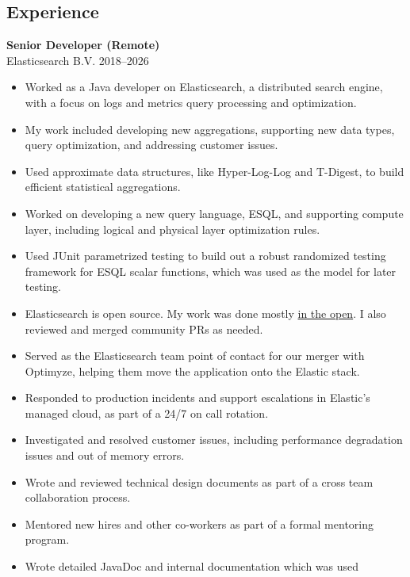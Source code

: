 \documentclass[margin]{res}
\begin{document}
\begin{resume}
\section{Experience}
{\bf Senior Developer (Remote)} \\
    Elasticsearch B.V. \hfill 2018--2026
    \begin{itemize}
        \item Worked as a Java developer on Elasticsearch, a distributed search
            engine, with a focus on logs and metrics query processing and optimization. 
        \item My work included developing new aggregations, supporting new data types,
            query optimization, and addressing customer issues.
        \item Used approximate data structures, like Hyper-Log-Log and T-Digest,
            to build efficient statistical aggregations.
        \item Worked on developing a new query language, ESQL, and supporting
            compute layer, including logical and physical layer optimization rules.
        \item Used JUnit parametrized testing to build out a robust randomized
            testing framework for ESQL scalar functions, which was used as the
            model for later testing.
        \item Elasticsearch is open source.  My work was done mostly
            \href{https://github.com/elastic/elasticsearch/pulls?q=is%3Apr+author%3Anot-napoleon+is%3Aclosed}{in
            the open}.  I also reviewed and merged community PRs as needed.
        \item Served as the Elasticsearch team point of contact for our merger
            with Optimyze, helping them move the application onto the Elastic
            stack.
        \item Responded to production incidents and support escalations in Elastic's managed cloud, 
            as part of a 24/7 on call rotation.
        \item Investigated and resolved customer issues, including performance 
            degradation issues and out of memory errors.
        \item Wrote and reviewed technical design documents as part of a 
            cross team collaboration process.
        \item Mentored new hires and other co-workers as part of a formal 
            mentoring program.
        \item Wrote detailed JavaDoc and internal documentation which was used

\end{itemize}
\end{resume}
\end{document}
